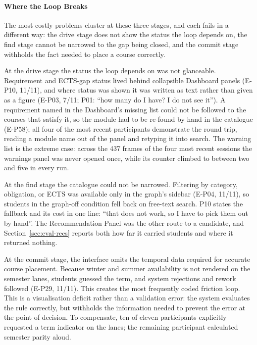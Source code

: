 \paragraph{Where the Loop Breaks}
\label{sec:eval-friction}

The most costly problems cluster at these three stages, and each fails in a different way: the
drive stage does not show the status the loop depends on, the find stage cannot be narrowed to the gap being closed, and the commit stage withholds the fact needed to place a course correctly.

At the drive stage the status the loop depends on was not glanceable. Requirement and ECTS-gap status lived behind collapsible Dashboard panels (E-P10, 11/11), and where status was shown it was written as text rather than given as a figure (E-P03, 7/11; P01: \enquote{how many do I have? I do not see it}). A requirement named in the Dashboard's missing list could not be followed to the courses that satisfy it, so the module had to be re-found by hand in the catalogue (E-P58); all four of the most recent participants demonstrate the round trip, reading a module name out of the panel and retyping it into search. The warning list is the extreme case: across the 437 frames of the four most recent sessions the warnings panel was never opened once, while its counter climbed to between two and five in every run.

At the find stage the catalogue could not be narrowed. Filtering by category, obligation, or ECTS was available only in the graph's sidebar (E-P04, 11/11), so students in the graph-off condition fell back on free-text search. P10 states the fallback and its cost in one line: \enquote{that does not work, so I have to pick them out by hand}. The Recommendation Panel was the other route to a candidate, and Section~\ref{sec:eval-recs} reports both how far it carried students and where it returned nothing.

At the commit stage, the interface omits the temporal data required for accurate course placement. Because winter and summer availability is not rendered on the semester lanes, students guessed the term, and system rejections and rework followed (E-P29, 11/11). This creates the most frequently coded friction loop. This is a visualisation deficit rather than a validation error: the system evaluates the rule correctly, but withholds the information needed to prevent the error at the point of decision. To compensate, ten of eleven participants explicitly requested a term indicator on the lanes; the remaining participant calculated semester parity aloud.

